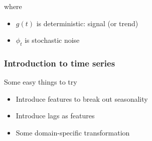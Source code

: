 \begin{frame}
{    where
    \begin{itemize}
    \item[] $g(t)$ is deterministic: signal (or trend)
    \item[] $\phi_t$ is stochastic noise
    \end{itemize}
  }
\end{frame}

\begin{frame}
  \frametitle{Introduction to time series}

  Some easy things to try
  
  \begin{itemize}
  \item Introduce features to break out seasonality
  \item Introduce lags as features
  \item Some domain-specific transformation
  \end{itemize}
\end{frame}



\begin{frame}
\end{frame}

